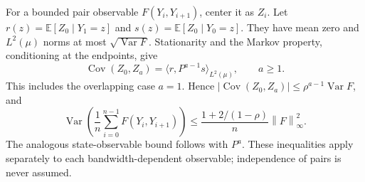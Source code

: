 \documentclass[11pt]{article}
\theoremstyle{remark}\newtheorem{remark}[theorem]{Remark}
\newcommand{\E}{\mathbb E}
\newcommand{\norm}[1]{\left\lVert#1\right\rVert}
\begin{document}
For a bounded pair observable $F(Y_i,Y_{i+1})$, center it as $Z_i$.
Let $r(z)=\E[Z_0\mid Y_1=z]$ and $s(z)=\E[Z_0\mid Y_0=z]$.
They have mean zero and $L^2(\mu)$ norms at most $\sqrt{\operatorname{Var}F}$.
Stationarity and the Markov property, conditioning at the endpoints, give
\begin{equation}\label{covariance}
 \operatorname{Cov}(Z_0,Z_a)=\langle r,P^{a-1}s\rangle_{L^2(\mu)},
 \qquad a\geq1.
\end{equation}
This includes the overlapping case $a=1$. Hence
$|\operatorname{Cov}(Z_0,Z_a)|\leq\rho^{a-1}\operatorname{Var}F$, and
\begin{equation}\label{variance}
 \operatorname{Var}\left(\frac1n\sum_{i=0}^{n-1}F(Y_i,Y_{i+1})\right)
 \leq\frac{1+2/(1-\rho)}{n}\norm{F}_\infty^2.
\end{equation}
The analogous state-observable bound follows with $P^a$. These inequalities
apply separately to each bandwidth-dependent observable; independence of
pairs is never assumed.
\end{document}
